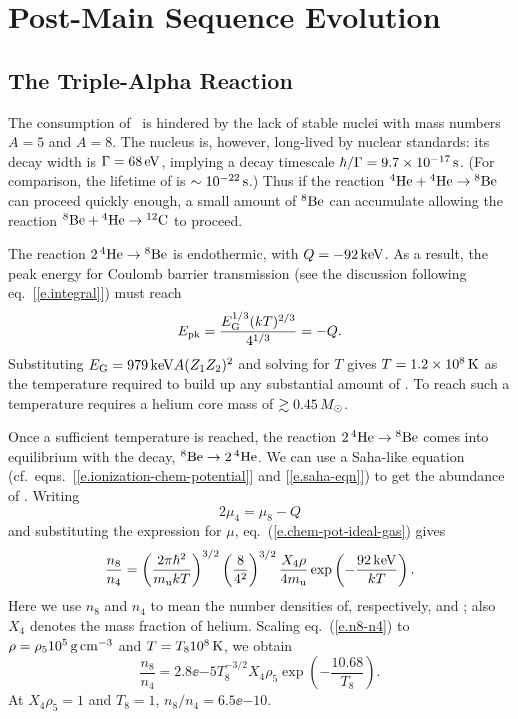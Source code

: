 \chapter{Post-Main Sequence Evolution}

\section{The Triple-Alpha Reaction}\label{s.triple-alpha}

The consumption of \helium\ is hindered by the lack of stable nuclei with mass numbers $A=5$ and $A=8$.  
The nucleus \beryllium[8] is, however, long-lived by nuclear standards: its decay width is $\Gamma = 68\nsp\eV$, implying a decay timescale $\hbar/\Gamma = 9.7\ee{-17}\nsp\second$.  (For comparison, the lifetime of \lithium[5] is $\sim 10^{-22}\nsp\second$.)  Thus if the reaction $\helium[4]+\helium[4]\to\beryllium[8]$ can proceed quickly enough, a small amount of $\beryllium[8]$ can accumulate allowing the reaction $\beryllium[8]+\helium\to\carbon$ to proceed.

The reaction $2\nsp\helium\to\beryllium[8]$ is endothermic, with $Q = -92\nsp\keV$.  As a result, the peak energy for Coulomb barrier transmission (see the discussion following eq.~[\ref{e.integral}]) must reach
\[ \Epk = \frac{\EG^{1/3}(kT)^{2/3}}{4^{1/3}} = -Q. \]
Substituting $\EG = 979\nsp\keV A (Z_{1}Z_{2})^{2}$ and solving for $T$ gives $T = 1.2\ee{8}\nsp\K$ as the temperature required to build up any substantial amount of \beryllium[8].  To reach such a temperature requires a helium core mass of $\gtrsim 0.45\nsp\Msun$.

Once a sufficient temperature is reached, the reaction $2\nsp\helium[4]\to\beryllium[8]$ comes into equilibrium with the decay, $\beryllium[8]\to2\nsp\helium$.  We can use a Saha-like equation (cf.\ eqns.~[\ref{e.ionization-chem-potential}] and [\ref{e.saha-eqn}]) to get the abundance of \beryllium[8].  Writing
\[ 2\mu_{4} = \mu_{8} - Q \]
and substituting the expression for $\mu$, eq.~(\ref{e.chem-pot-ideal-gas}) gives
\begin{equation}\label{e.n8-n4}
\frac{n_{8}}{n_{4}} = \left(\frac{2\pi\hbar^{2}}{\mb kT}\right)^{3/2}\left(\frac{8}{4^{2}}\right)^{3/2}\frac{X_{4}\rho}{4\mb}\exp\left(-\frac{92\nsp\keV}{kT}\right).
\end{equation}
Here we use $n_{8}$ and $n_{4}$ to mean the number densities of, respectively, \beryllium[8] and \helium; also $X_{4}$ denotes the mass fraction of helium.
Scaling eq.~(\ref{e.n8-n4}) to $\rho = \rho_{5} 10^{5}\nsp\grampercc$ and $T = T_{8}10^{8}\nsp\K$, we obtain
\begin{equation}\label{e.n8-to-n4}
 \frac{n_{8}}{n_{4}} = 2.8\ee{-5} T_{8}^{-3/2}X_{4}\rho_{5}\exp\left(-\frac{10.68}{T_{8}}\right).
\end{equation}
At $X_{4}\rho_{5}=1$ and $T_{8} = 1$, $n_{8}/n_{4} = 6.5\ee{-10}$.  

